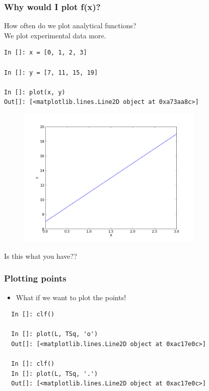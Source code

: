 \documentclass[14pt,compress]{beamer}
\begin{document}
\begin{frame}[fragile]
\frametitle{Why would I plot f(x)?}
How often do we plot analytical functions?\\We plot experimental data more.
\begin{lstlisting}
In []: x = [0, 1, 2, 3]

In []: y = [7, 11, 15, 19]

In []: plot(x, y)
Out[]: [<matplotlib.lines.Line2D object at 0xa73aa8c>]
\end{lstlisting}
\end{frame}

\begin{frame}[fragile]
\begin{figure}
\includegraphics[width=3.5in]{data/straightline.png}
\end{figure}
\alert{Is this what you have??}
\end{frame}

\begin{frame}[fragile]
\frametitle{Plotting points}
\begin{itemize}
\item What if we want to plot the points!
\end{itemize}
\begin{lstlisting}
  In []: clf()

  In []: plot(L, TSq, 'o')
  Out[]: [<matplotlib.lines.Line2D object at 0xac17e0c>]

  In []: clf()
  In []: plot(L, TSq, '.')
  Out[]: [<matplotlib.lines.Line2D object at 0xac17e0c>]
\end{lstlisting}
\end{frame}
\end{document}
